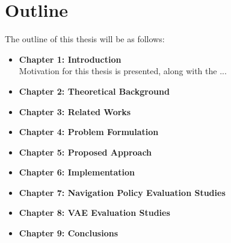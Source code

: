 

\section{Outline}

The outline of this thesis will be as follows:
\vspace{2mm}
\begin{itemize}
    \item \textbf{Chapter 1: Introduction} \\
    Motivation for this thesis is presented, along with the ... \vspace{3mm}

    \item \textbf{Chapter 2: Theoretical Background}
    \vspace{3mm}
    
    \item \textbf{Chapter 3: Related Works} 
    \vspace{3mm}
    
    \item \textbf{Chapter 4: Problem Formulation} 
    \vspace{3mm}
    
    \item \textbf{Chapter 5: Proposed Approach}
    \vspace{3mm}
    
    \item \textbf{Chapter 6: Implementation} 
    \vspace{3mm}
    
    \item \textbf{Chapter 7: Navigation Policy Evaluation Studies} 
    \vspace{3mm}
    
    \item \textbf{Chapter 8: VAE Evaluation Studies} 
    \vspace{3mm}
    
    \vspace{3mm}
    
    \item \textbf{Chapter 9: Conclusions} \vspace{3mm}
    
\end{itemize}





